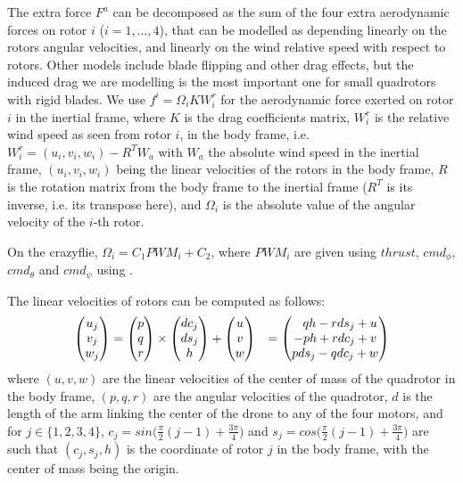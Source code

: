 \documentclass[anonymous=true,format=sigconf, screen=true, review=false]{acmart}
\begin{document}
The extra force $F^a$ can be decomposed as the sum of the four extra aerodynamic forces on rotor $i$ ($i=1,\ldots,4$), that can be modelled as depending linearly on the rotors angular velocities, and linearly on the wind relative speed with respect to rotors. Other models \cite{Bangura} include blade flipping and other drag effects, but the induced drag we are modelling is the most important one for small quadrotors with rigid blades. %
We use $f^i= \Omega_i K W^r_i$  for the aerodynamic force exerted on rotor $i$ 
in the inertial frame, where $K$ is the drag coefficients matrix, %
$W^r_i$ is the relative wind speed as seen from rotor $i$, in the body frame, i.e. $W^r_i=(u_i, v_i, w_i)-R^T W_a$ with $W_a$ the absolute wind speed in the inertial frame, $(u_i, v_i, w_i)$ being the linear velocities of the rotors in the body frame, $R$ is the rotation matrix from the body frame to the inertial frame ($R^T$ is its inverse, i.e. its transpose here), and $\Omega_i $ is the absolute value of the  angular velocity of the $i$-th rotor. 

On the crazyflie, $\Omega_i=C_1 PWM_i+C_2$, where $PWM_i$ are given using $thrust$, $cmd_{\phi}$, $cmd_{\theta}$ and $cmd_{\psi}$ using .

The linear velocities of rotors can be computed as follows:
\begin{equation*}
\begin{aligned}
\begin{pmatrix}u_j \\ v_j \\ w_j\end{pmatrix} &= \begin{pmatrix}p \\ q \\ r\end{pmatrix}
  \times \begin{pmatrix}d c_j \\ d s_j \\ h\end{pmatrix} + \begin{pmatrix}u \\ v \\ w\end{pmatrix} 
  &=
  \begin{pmatrix}
    \phantom{-}qh-rds_j+u \\
    -ph+rdc_j+v \\
    pds_j-qdc_j+w
  \end{pmatrix}
\end{aligned}
\end{equation*}
\noindent where $(u,v,w)$ are the linear velocities of the
center of mass of the quadrotor in the body frame, $(p,q,r)$ are the angular velocities of the quadrotor, $d$ is the length of the arm linking the center of the drone to any of the four motors, and for $j \in \{1, 2, 3, 4\}$, 
$c_j=sin\big(\frac{\pi}{2}(j-1)+\frac{3\pi}{4}\big)$ and $s_j=cos\big(\frac{\pi}{2}(j-1)+\frac{3\pi}{4}\big)$ are such that  $(c_j,s_j,h)$ is the coordinate of rotor $j$ in the body frame, with the center of mass being the origin.
\end{document}
